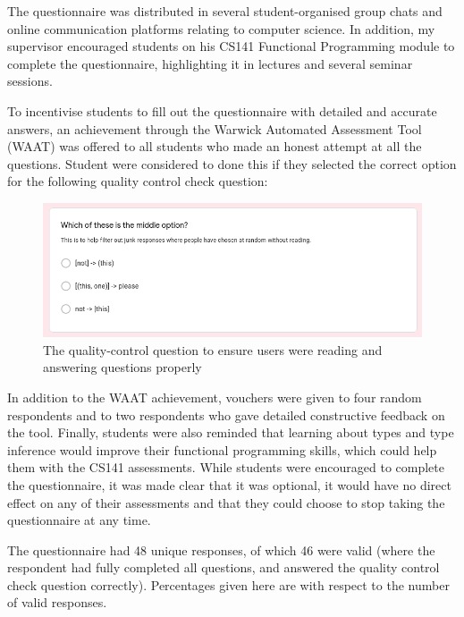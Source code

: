 \documentclass[a4paper,fleqn,oneside,12pt]{report}
\begin{document}
The questionnaire was distributed in several student-organised group chats and online communication platforms relating to computer science. In addition, my supervisor encouraged students on his CS141 Functional Programming module to complete the questionnaire, highlighting it in lectures and several seminar sessions.

To incentivise students to fill out the questionnaire with detailed and accurate answers, an achievement through the Warwick Automated Assessment Tool (WAAT) was offered to all students who made an honest attempt at all the questions. Student were considered to done this if they selected the correct option for the following quality control check question:

{\centering \begin{figure}[h!]
  \centering
  \includegraphics[width=0.9\linewidth]{images/image32.png}
  \caption{The quality-control question to ensure users were reading and answering questions properly}
\end{figure} \par}

In addition to the WAAT achievement, vouchers were given to four random respondents and to two respondents who gave detailed constructive feedback on the tool. Finally, students were also reminded that learning about types and type inference would improve their functional programming skills, which could help them with the CS141 assessments. While students were encouraged to complete the questionnaire, it was made clear that it was optional, it would have no direct effect on any of their assessments and that they could choose to stop taking the questionnaire at any time.

The questionnaire had 48 unique responses, of which 46 were valid (where the respondent had fully completed all questions, and answered the quality control check question correctly). Percentages given here are with respect to the number of valid responses.
\end{document}
